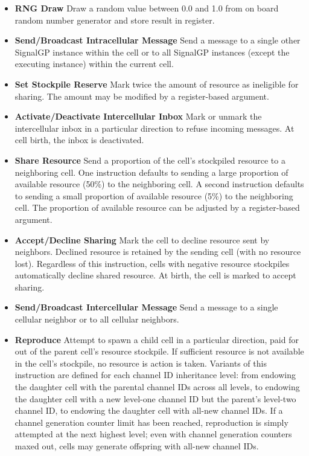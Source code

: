 \begin{itemize}
\item \textbf{RNG Draw}
Draw a random value between 0.0 and 1.0 from on board random number generator and store result in register.
\item \textbf{Send/Broadcast Intracellular Message}
Send a message to a single other SignalGP instance within the cell or to all SignalGP instances (except the executing instance) within the current cell.
\item \textbf{Set Stockpile Reserve}
Mark twice the amount of resource as ineligible for sharing.
The amount may be modified by a register-based argument.
\item \textbf{Activate/Deactivate Intercellular Inbox}
Mark or unmark the intercellular inbox in a particular direction to refuse incoming messages.
At cell birth, the inbox is deactivated.
\item \textbf{Share Resource}
Send a proportion of the cell's stockpiled resource to a neighboring cell.
One instruction defaults to sending a large proportion of available resource (50\%) to the neighboring cell.
A second instruction defaults to sending a small proportion of available resource (5\%) to the neighboring cell.
The proportion of available resource can be adjusted by a register-based argument.
\item \textbf{Accept/Decline Sharing}
Mark the cell to decline resource sent by neighbors.
Declined resource is retained by the sending cell (with no resource lost).
Regardless of this instruction, cells with negative resource stockpiles automatically decline shared resource.
At birth, the cell is marked to accept sharing.
\item \textbf{Send/Broadcast Intercellular Message}
Send a message to a single cellular neighbor or to all cellular neighbors.
\item \textbf{Reproduce}
Attempt to spawn a child cell in a particular direction, paid for out of the parent cell's resource stockpile.
If sufficient resource is not available in the cell's stockpile, no resource is action is taken.
Variants of this instruction are defined for each channel ID inheritance level: from endowing the daughter cell with the parental channel IDs across all levels, to endowing the daughter cell with a new level-one channel ID but the parent's level-two channel ID, to endowing the daughter cell with all-new channel IDs.
If a channel generation counter limit has been reached, reproduction is simply attempted at the next highest level; even with channel generation counters maxed out, cells may generate offspring with all-new channel IDs.

\end{itemize}
